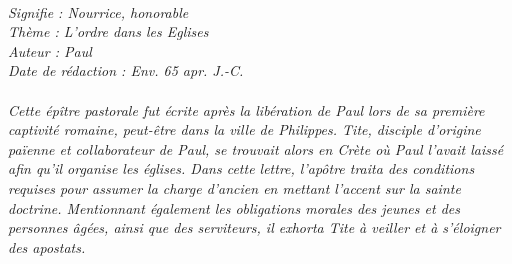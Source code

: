 \BFont
\noindent\hrulefill
\textit{
\bigskip
{\centering{}
\\Signifie : Nourrice, honorable
\\Thème : L'ordre dans les Eglises
\\Auteur : Paul
\\Date de rédaction : Env. 65 apr. J.-C.\\}
}
\textit{
\\Cette épître pastorale fut écrite après la libération de Paul lors de sa première captivité romaine, peut-être dans la ville de Philippes. Tite, disciple d’origine païenne et collaborateur de Paul, se trouvait alors en Crète où Paul l’avait laissé afin qu’il organise les églises. Dans cette lettre, l’apôtre traita des conditions requises pour assumer la charge d’ancien en mettant l’accent sur la sainte doctrine. Mentionnant également les obligations morales des jeunes et des personnes âgées, ainsi que des serviteurs, il exhorta Tite à veiller et à s’éloigner des apostats.\bigskip
}
\par\nobreak\noindent\hrulefill
